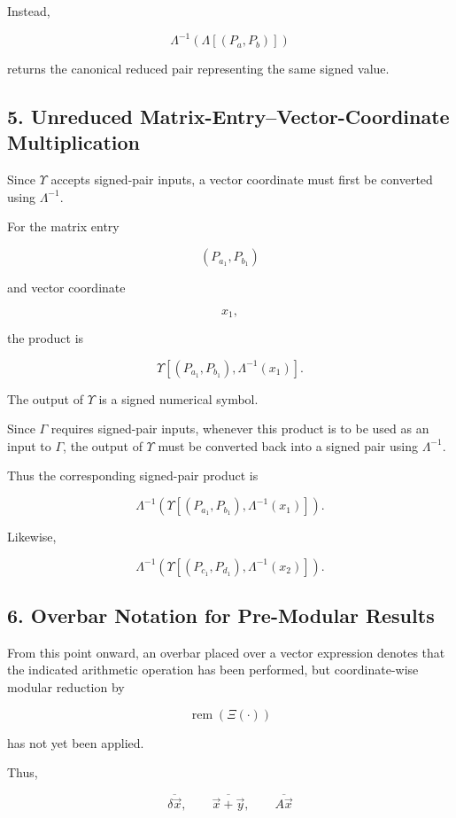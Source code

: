 \documentclass[12pt]{article}
\begin{document}
Instead,

\[
\Lambda^{-1}
\left(
\Lambda[(P_a,P_b)]
\right)
\]

returns the canonical reduced pair representing the same signed value.

\subsection*{5. Unreduced Matrix-Entry--Vector-Coordinate Multiplication}

Since \(\Upsilon\) accepts signed-pair inputs, a vector coordinate must first be converted using \(\Lambda^{-1}\).

For the matrix entry

\[
(P_{a_1},P_{b_1})
\]

and vector coordinate

\[
x_1,
\]

the product is

\[
\Upsilon
\left[
(P_{a_1},P_{b_1}),
\Lambda^{-1}(x_1)
\right].
\]

The output of \(\Upsilon\) is a signed numerical symbol.

Since \(\Gamma\) requires signed-pair inputs, whenever this product is to be used as an input to \(\Gamma\), the output of \(\Upsilon\) must be converted back into a signed pair using \(\Lambda^{-1}\).

Thus the corresponding signed-pair product is

\[
\boxed{
\Lambda^{-1}
\left(
\Upsilon
\left[
(P_{a_1},P_{b_1}),
\Lambda^{-1}(x_1)
\right]
\right).
}
\]

Likewise,

\[
\boxed{
\Lambda^{-1}
\left(
\Upsilon
\left[
(P_{c_1},P_{d_1}),
\Lambda^{-1}(x_2)
\right]
\right).
}
\]

\subsection*{6. Overbar Notation for Pre-Modular Results}

From this point onward, an overbar placed over a vector expression denotes that the indicated arithmetic operation has been performed, but coordinate-wise modular reduction by

\[
\operatorname{rem}(\Xi(\cdot))
\]

has not yet been applied.

Thus,

\[
\boxed{
\overline{\delta\vec{x}},
\qquad
\overline{\vec{x}+\vec{y}},
\qquad
\overline{A\vec{x}}
}
\]
\end{document}
